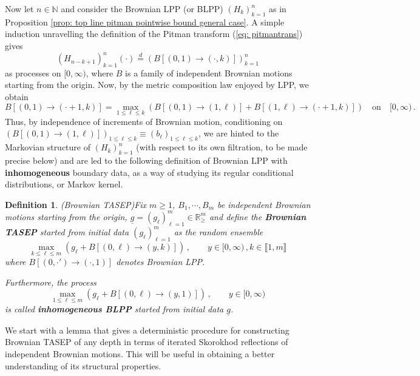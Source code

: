 \documentclass[11pt, reqno]{amsart}
\numberwithin{equation}{section}
\newcounter{dummy} \numberwithin{dummy}{section}
\newtheorem{definition}[dummy]{Definition}
\newcommand{\N}{\ensuremath{\mathbb{N}}}
\newcommand{\R}{\ensuremath{\mathbb{R}}}
\begin{document}
Now let $n\in \N$ and consider the Brownian LPP (or BLPP) $(H_{k})_{k=1}^n$ as in Proposition \ref{prop: top line pitman pointwise bound general case}. A simple induction unravelling the definition of the Pitman transform (\ref{eq: pitmantrans}) gives 
\[
(H_{n-k+1})_{k=1}^n(\cdot)\stackrel{d}{=} (B[(0, 1)\to (\cdot, k)])_{k=1}^n
\]
as processes on $[0,\infty)$, where $B$ is a family of independent Brownian motions starting from the origin. Now, by the metric composition law enjoyed by LPP, we obtain 
\[
B[(0, 1)\to (\cdot+1, k)] = \max_{1\le \ell \le k}(B[(0, 1)\to (1, \ell )] + B[(1,\ell)\to (\cdot+1, k)])\quad \mathrm{on}\quad [0,\infty)\,.
\]
Thus, by independence of increments of Brownian motion, conditioning on $(B[(0, 1)\to (1, \ell )])_{1\le \ell\le k}\equiv(b_\ell)_{1\le \ell\le k}$, we are hinted to the Markovian structure of $(H_k)_{k=1}^n$ (with respect to its own filtration, to be made precise below) and are led to the following definition of Brownian LPP with \textbf{inhomogeneous} boundary data, as a way of studying its regular conditional distributions, or Markov kernel.

\begin{definition}(Brownian TASEP)\label{def: brownian tasep}
    Fix $m\ge 1$, $B_1, \cdots, B_m$ be independent Brownian motions starting from the origin, $\underline{g} = (g_\ell)_{\ell =1}^m \in\R^m_{\ge}$ and define the \textbf{Brownian TASEP} started from initial data $(g_\ell)_{\ell =1}^m$ as the random ensemble
     $$\displaystyle\max_{k\le \ell \le m}(g_{\ell} + B[(0,\ell)\to (y, k)])\,, \qquad  y\in [0,\infty)\,, k\in\llbracket 1, m \rrbracket$$ where $B[(0,\cdot')\to (\cdot, 1)]$ denotes Brownian LPP. 

     Furthermore, the process 
     \[
     \displaystyle\max_{1\le \ell \le m}(g_{\ell} + B[(0,\ell)\to (y, 1)])\,, \qquad  y\in [0,\infty)
     \]
     is called \textbf{inhomogeneous BLPP} started from initial data $\underline{g}$.
\end{definition}

We start with a lemma that gives a deterministic procedure for constructing Brownian TASEP of any depth in terms of iterated Skorokhod reflections of independent Brownian motions. This will be useful in obtaining a better understanding of its structural properties.
\end{document}
